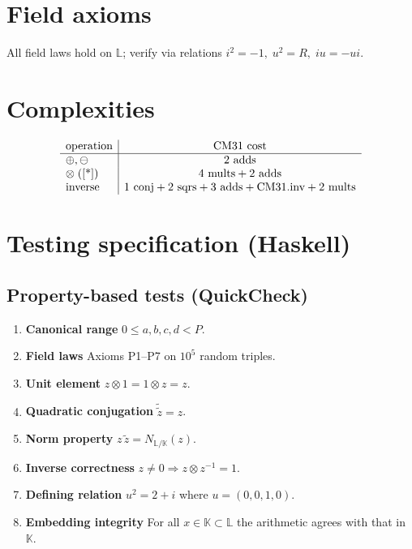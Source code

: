 \documentclass{article}
\begin{document}
\section{Field axioms}

All field laws hold on \(\mathbb{L}\); verify via
relations \(i^{2}=-1,\;u^{2}=R,\;iu=-ui\).

\section{Complexities}

\[
\begin{array}{l|c}
\text{operation} & \text{CM31 cost} \\ \hline
\oplus,\ominus & 2\text{ adds} \\
\otimes\;(\ref{*}) & 4\text{ mults} + 2\text{ adds} \\
\text{inverse} & 1\text{ conj}+2\text{ sqrs}+3\text{ adds}
                 +\text{CM31.inv}+2\text{ mults}
\end{array}
\]

\section{Testing specification (Haskell)}

\subsection{Property-based tests (QuickCheck)}

\begin{enumerate}[label=\textbf{Q\arabic*}.]
\item \textbf{Canonical range}  
      \(0\le a,b,c,d < P\).
\item \textbf{Field laws}  
      Axioms P1–P7 on \(10^{5}\) random triples.
\item \textbf{Unit element}  
      \(z\otimes1 = 1\otimes z = z\).
\item \textbf{Quadratic conjugation}  
      \(\tilde{\tilde{z}}=z\).
\item \textbf{Norm property}  
      \(z\,\tilde{z}=N_{\mathbb{L}/\mathbb{K}}(z)\).
\item \textbf{Inverse correctness}  
      \(z\neq0\Rightarrow z\otimes z^{-1}=1\).
\item \textbf{Defining relation}  
      \(u^{2}=2+i\) where \(u=(0,0,1,0)\).
\item \textbf{Embedding integrity}  
      For all \(x\in\mathbb{K}\subset\mathbb{L}\)
      the arithmetic agrees with that in \(\mathbb{K}\).
\end{enumerate}
\end{document}
